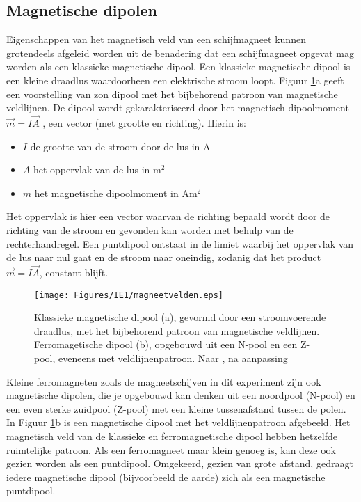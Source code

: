 \subsection{Magnetische dipolen}
Eigenschappen van het magnetisch veld van een schijfmagneet kunnen grotendeels afgeleid worden uit de benadering dat een schijfmagneet opgevat mag worden als een klassieke magnetische dipool. Een klassieke magnetische dipool is een kleine draadlus waardoorheen een elektrische stroom loopt. Figuur \ref{fig:magneetvelden}a geeft een voor\-stelling van zo\textquotesingle n dipool met het bijbehorend patroon van magnetische veldlijnen. De dipool wordt gekarakteriseerd door het magnetisch dipoolmoment \(\vec{m}=I\vec{A}\) , een vector (met grootte en richting). Hierin is:
%
\begin{itemize}
    \item $I$ de grootte van de stroom door de lus in A
	\item $A$ het oppervlak van de lus in m$^2$
	\item $m$ het magnetische dipoolmoment in Am$^2$
\end{itemize}
%
Het oppervlak is hier een vector waarvan de richting bepaald wordt door de richting van de stroom en gevonden kan worden met behulp van de rechterhandregel. Een puntdipool ontstaat in de limiet waarbij het oppervlak van de lus naar nul gaat en de stroom naar oneindig, zodanig dat het product \(\vec{m}=I\vec{A}\), constant blijft.
%
\begin{figure}[h!]
    \centering
    \texttt{[image: Figures/IE1/magneetvelden.eps]}
    \caption{Klassieke magnetische dipool (a), gevormd door een stroomvoerende draadlus, met het bijbehorend patroon van magnetische veldlijnen. Ferromagetische dipool (b), opgebouwd uit een N-pool en een Z-pool, eveneens met veldlijnenpatroon. Naar \cite{grant_electromagnetism_2008}, na aanpassing}
    \label{fig:magneetvelden}
\end{figure}
%
Kleine ferromagneten zoals de magneetschijven in dit experiment zijn ook magnetische dipolen, die je opgebouwd kan denken uit een noordpool (N-pool) en een even sterke zuidpool (Z-pool) met een kleine tussenafstand tussen de polen. In Figuur \ref{fig:magneetvelden}b is een magnetische dipool met het veldlijnenpatroon afgebeeld. Het magnetisch veld van de klassieke en ferromagnetische dipool hebben hetzelfde ruimtelijke patroon. Als een ferromagneet maar klein genoeg is, kan deze ook gezien worden als een puntdipool.  Omgekeerd, gezien van grote afstand, gedraagt iedere magnetische dipool (bijvoorbeeld de aarde) zich als een magnetische puntdipool. 
%
